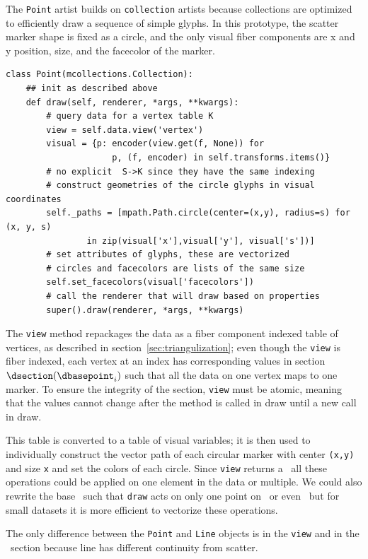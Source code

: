 \documentclass[../main.tex]{subfiles}
\begin{document}
The \texttt{Point} artist builds on \texttt{collection} artists because collections are optimized to efficiently draw a sequence of simple glyphs. In this prototype, the scatter marker shape is fixed as a circle, and the only visual fiber components are x and y position, size, and the facecolor of the marker. 
\begin{verbatim}
class Point(mcollections.Collection):
    ## init as described above
    def draw(self, renderer, *args, **kwargs):
        # query data for a vertex table K
        view = self.data.view('vertex') 
        visual = {p: encoder(view.get(f, None)) for
                     p, (f, encoder) in self.transforms.items()}
        # no explicit  S->K since they have the same indexing
        # construct geometries of the circle glyphs in visual coordinates
        self._paths = [mpath.Path.circle(center=(x,y), radius=s) for (x, y, s) 
                in zip(visual['x'],visual['y'], visual['s'])] 
        # set attributes of glyphs, these are vectorized 
        # circles and facecolors are lists of the same size
        self.set_facecolors(visual['facecolors'])
        # call the renderer that will draw based on properties
        super().draw(renderer, *args, **kwargs)
\end{verbatim} 
The \texttt{view} method repackages the data as a fiber component indexed table of vertices, as described in section~\ref{sec:triangulization}; even though the \texttt{view} is fiber indexed, each vertex at an index \dbasepoint has corresponding values in section $\dsection(\dbasepoint_{i})$ such that all the data on one vertex maps to one marker. To ensure the integrity of the section, \texttt{view} must be atomic, meaning that the values cannot change after the method is called in draw until a new call in draw.

This table is converted to a table of visual variables; it is then used to individually construct the vector path of each circular marker with center \texttt{(x,y)} and size \texttt{x} and set the colors of each circle. Since \texttt{view} returns a \desection\, all these operations could be applied on one element in the data or multiple.  We could also rewrite the base \vmark\ such that \texttt{draw} acts on only one point on \dbase\ or even \gbase\, but for small datasets it is more efficient to vectorize these operations. 

The only difference between the \texttt{Point} and \texttt{Line} objects is in the \texttt{view} and in the \vmark\ section because line has different continuity from scatter.
\end{document}

